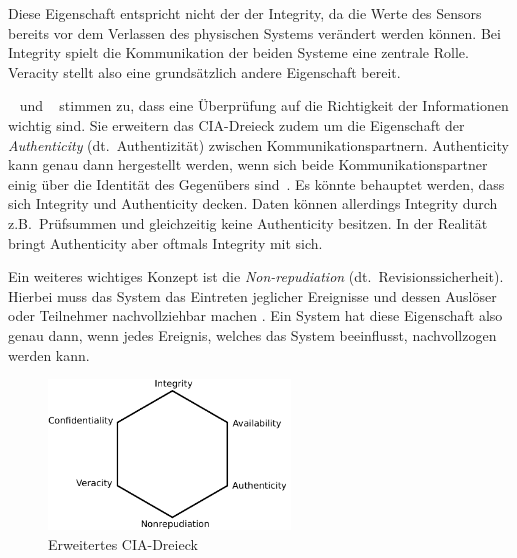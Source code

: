 \documentclass[final,bibliography=totocnumbered]{include/sikseminar}
\begin{document}
    Diese Eigenschaft entspricht nicht der der Integrity, da die Werte des Sensors bereits vor dem Verlassen des physischen Systems verändert werden können.
    Bei Integrity spielt die Kommunikation der beiden Systeme eine zentrale Rolle.
    Veracity stellt also eine grundsätzlich andere Eigenschaft bereit.

    \citeauthor{WYX+10}~\cite{WYX+10} und \citeauthor{SFJ17}~\cite{SFJ17} stimmen zu, dass eine Überprüfung auf die Richtigkeit der Informationen wichtig sind.
    Sie erweitern das CIA-Dreieck zudem um die Eigenschaft der \textit{Authenticity} (dt.\ Authentizität) zwischen Kommunikationspartnern.
    Authenticity kann genau dann hergestellt werden, wenn sich beide Kommunikationspartner einig über die Identität des Gegenübers sind~\cite{CH13}.
    Es könnte behauptet werden, dass sich Integrity und Authenticity decken.
    Daten können allerdings Integrity durch z.B.\ Prüfsummen und gleichzeitig keine Authenticity besitzen.
    In der Realität bringt Authenticity aber oftmals Integrity mit sich.

    Ein weiteres wichtiges Konzept ist die \textit{Non-repudiation} (dt.\ Revisionssicherheit).
    Hierbei muss das System das Eintreten jeglicher Ereignisse und dessen Auslöser oder Teilnehmer nachvollziehbar machen \cite{CH13}.
    Ein System hat diese Eigenschaft also genau dann, wenn jedes Ereignis, welches das System beeinflusst, nachvollzogen werden kann.

    \begin{figure}[ht]
        \centering
        \includegraphics[height=4cm]{triad}
        \caption{Erweitertes CIA-Dreieck}
        \label{fig:triad}
    \end{figure}
\end{document}
